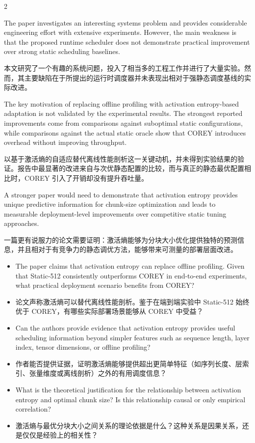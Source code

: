 \documentclass[10pt,a4paper]{article}
\newcommand{\Pair}[2]{#1\par\switchcolumn #2\par\switchcolumn*}
\newcommand{\fieldhead}[1]{{\color{accent}\sffamily\bfseries #1}}
\newcommand{\PairHead}[2]{\Pair{\needspace{5\baselineskip}\fieldhead{#1}}%
                               {\needspace{5\baselineskip}\fieldhead{#2}}}
\newcommand{\PItem}[3]{\Pair{\begin{itemize}[label={#1}]\item #2\end{itemize}}%
                            {\begin{itemize}[label={#1}]\item #3\end{itemize}}}
\begin{document}
\begin{paracol}{2}
\PairHead{Justification}{评分理由}

\Pair{The paper investigates an interesting systems problem and provides
considerable engineering effort with extensive experiments. However, the main
weakness is that the proposed runtime scheduler does not demonstrate practical
improvement over strong static scheduling baselines.}
{本文研究了一个有趣的系统问题，投入了相当多的工程工作并进行了大量实验。然而，其主要缺陷在于所提出的运行时调度器并未表现出相对于强静态调度基线的实际改进。}

\Pair{The key motivation of replacing offline profiling with activation
entropy-based adaptation is not validated by the experimental results. The
strongest reported improvements come from comparisons against suboptimal static
configurations, while comparisons against the actual static oracle show that COREY
introduces overhead without improving throughput.}
{以基于激活熵的自适应替代离线性能剖析这一关键动机，并未得到实验结果的验证。报告中最显著的改进来自与次优静态配置的比较，而与真正的静态最优配置相比时，COREY 引入了开销却没有提升吞吐量。}

\Pair{A stronger paper would need to demonstrate that activation entropy provides
unique predictive information for chunk-size optimization and leads to measurable
deployment-level improvements over competitive static tuning approaches.}
{一篇更有说服力的论文需要证明：激活熵能够为分块大小优化提供独特的预测信息，并且相对于有竞争力的静态调优方法，能够带来可测量的部署层面改进。}

\PairHead{Feedback}{反馈意见}

\PItem{Q1.}{The paper claims that activation entropy can replace offline profiling.
Given that Static-512 consistently outperforms COREY in end-to-end experiments, what
practical deployment scenario benefits from COREY?}
{论文声称激活熵可以替代离线性能剖析。鉴于在端到端实验中 Static-512 始终优于 COREY，有哪些实际部署场景能够从 COREY 中受益？}

\PItem{Q2.}{Can the authors provide evidence that activation entropy provides useful
scheduling information beyond simpler features such as sequence length, layer
index, tensor dimensions, or offline profiling?}
{作者能否提供证据，证明激活熵能够提供超出更简单特征（如序列长度、层索引、张量维度或离线剖析）之外的有用调度信息？}

\PItem{Q3.}{What is the theoretical justification for the relationship between
activation entropy and optimal chunk size? Is this relationship causal or only
empirical correlation?}
{激活熵与最优分块大小之间关系的理论依据是什么？这种关系是因果关系，还是仅仅是经验上的相关性？}


\end{paracol}
\end{document}

